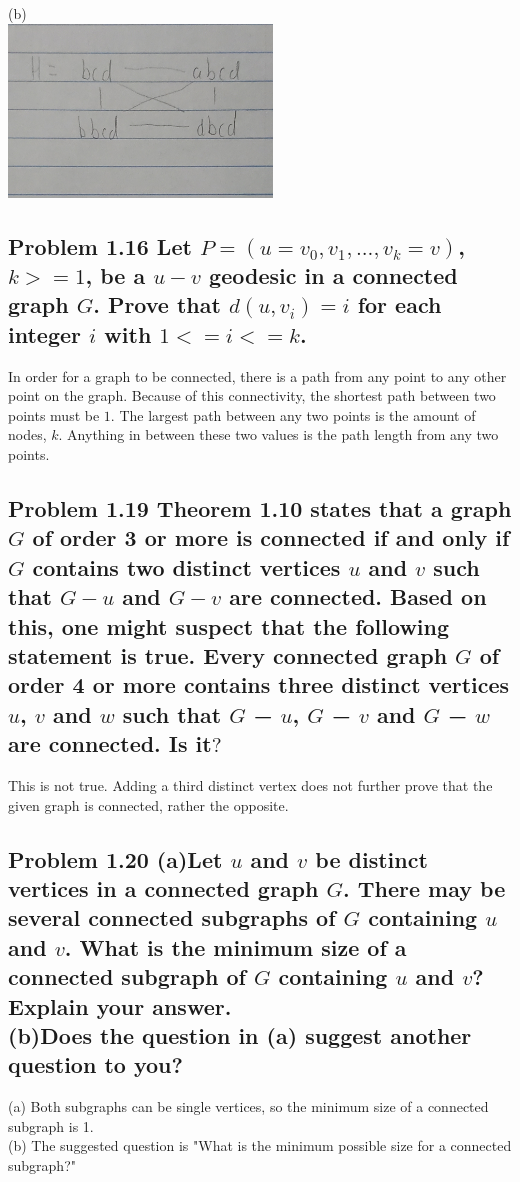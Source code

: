 \documentclass[10pt,a4paper]{article}
\begin{document}
(b)\\
\includegraphics[width=7cm]{question1.8b}

\subsection*{Problem 1.16
Let $P = (u = v_{0}, v_{1}, ..., v_{k} = v)$, $k >= 1$, be a $u - v$ geodesic in a connected graph $G$. 
Prove that $d(u, v_{i}) = i$ for each integer $i$ with $1 <= i <= k$.
}

In order for a graph to be connected, there is a path from any point to any other point on the graph.
Because of this connectivity, the shortest path between two points must be $1$. The largest path between any 
two points is the amount of nodes, $k$. Anything in between these two values is the path length from any two points.

\subsection*{Problem 1.19
Theorem 1.10 states that a graph $G$ of order 3 or more is connected if and only if $G$ contains
two distinct vertices $u$ and $v$ such that $G − u$ and $G − v$ are connected. Based on this, one might
suspect that the following statement is true. Every connected graph $G$ of order 4 or more
contains three distinct vertices $u$, $v$ and $w$ such that $G$ − $u$, $G$ − $v$ and $G$ − $w$ are connected. Is it$?$
}

This is not true. Adding a third distinct vertex does not further prove that the given graph is connected, rather the opposite.

\subsection*{Problem 1.20
(a)Let $u$ and $v$ be distinct vertices in a connected graph $G$. There may be several connected
subgraphs of $G$ containing $u$ and $v$. What is the minimum size of a connected subgraph of $G$
containing $u$ and $v$? Explain your answer.\\
(b)Does the question in (a) suggest another question to you?
}

(a) Both subgraphs can be single vertices, so the minimum size of a connected subgraph is 1.\\
(b) The suggested question is "What is the minimum possible size for a connected subgraph?"
\end{document}
